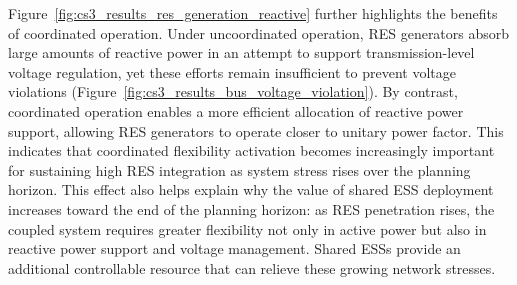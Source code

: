 \documentclass[preprint,12pt]{elsarticle}
\begin{document}
Figure~\ref{fig:cs3_results_res_generation_reactive} further highlights the benefits of coordinated operation. Under uncoordinated operation, RES generators absorb large amounts of reactive power in an attempt to support transmission-level voltage regulation, yet these efforts remain insufficient to prevent voltage violations (Figure~\ref{fig:cs3_results_bus_voltage_violation}). By contrast, coordinated operation enables a more efficient allocation of reactive power support, allowing RES generators to operate closer to unitary power factor. This indicates that coordinated flexibility activation becomes increasingly important for sustaining high RES integration as system stress rises over the planning horizon.
This effect also helps explain why the value of shared ESS deployment increases toward the end of the planning horizon: as RES penetration rises, the coupled system requires greater flexibility not only in active power but also in reactive power support and voltage management. Shared ESSs provide an additional controllable resource that can relieve these growing network stresses.




\end{document}
